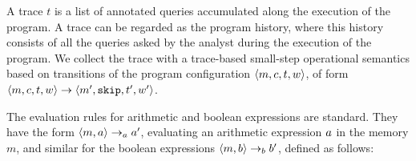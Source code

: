 \documentclass[a4paper,11pt]{article}
\begin{document}
A trace $t$ is a list of annotated queries accumulated along the execution of the program. 
A trace can be regarded as the program history, where this history consists of all the queries asked by the analyst during the execution of the program. 
We collect the trace with a trace-based small-step operational semantics based on transitions of the program configuration $\langle m, c, t,w \rangle$,
of form $ \langle m,c, t, w \rangle \to \langle m', \mathtt{skip}, t', w' \rangle $. 

%
%
The evaluation rules for arithmetic and boolean expressions are standard. 
They have the form $\langle m,a \rangle \rightarrow_a a' $, evaluating an arithmetic expression $a$ in the memory $m$, and similar for the boolean expressions $\langle m, b \rangle \rightarrow_b b'$, defined as follows:
%
%
\end{document}
